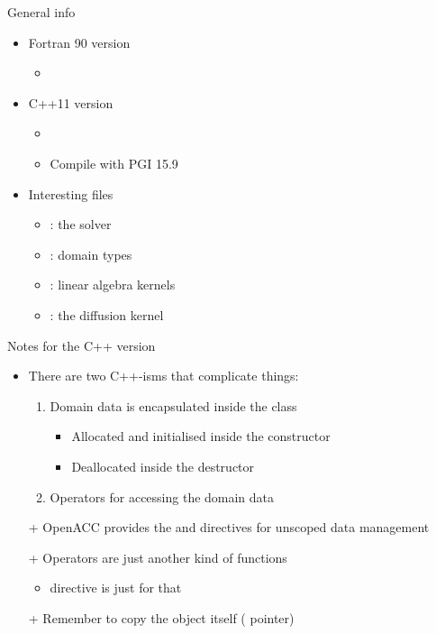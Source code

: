 \documentclass[12pt,aspectratio=169]{beamer}
\begin{document}
\begin{frame}[fragile]{General info}
  \begin{itemize}
  \item Fortran 90 version
    \begin{itemize}
    \item {}
    \end{itemize}
  \item C++11 version
    \begin{itemize}
    \item {}
    \item Compile with PGI 15.9
    \end{itemize}
  \item Interesting files
    \begin{itemize}
    \item{}: the solver
    \item{}: domain types
    \item{}: linear algebra kernels
    \item{}: the diffusion kernel
    \end{itemize}
  \end{itemize}
\end{frame}

\begin{frame}{Notes for the C++ version}
  \begin{itemize}
  \item There are two C++-isms that complicate things:
    \begin{enumerate}
    \item Domain data is encapsulated inside the  class
      \begin{itemize}
      \item Allocated and initialised inside the constructor
      \item Deallocated inside the destructor
      \end{itemize}
    \item Operators for accessing the domain data
    \end{enumerate}
  \item[+] OpenACC provides the  and  directives for unscoped data management
  \item[+] Operators are just another kind of functions
    \begin{itemize}
    \item {} directive is just for that
    \end{itemize}
  \item[+] Remember to copy the object itself ( pointer)
  \end{itemize}
\end{frame}
\end{document}
